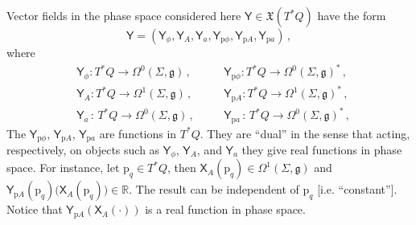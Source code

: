 \documentclass[12pt]{amsart}
\theoremstyle{plain}
\theoremstyle{definition}
\theoremstyle{remark}
\numberwithin{equation}{section}  %
\begin{document}
Vector fields in the phase space considered here $\mathsf{Y}\in\mathfrak{X}(T^*\!Q)$ have the form
\begin{equation}\label{vector_field}
\mathsf{Y}=(\mathsf{Y}_\phi,\mathsf{Y}_A,\mathsf{Y}_{a},\mathsf{Y}_{\mathrm{p} \phi},\mathsf{Y}_{\mathrm{p} A},\mathsf{Y}_{\mathrm{p} a})\,,
\end{equation}
where
\begin{align*}
&\mathsf{Y}_\phi:T^*\!Q\rightarrow\Omega^0(\Sigma,\mathfrak{g})\,,\quad &&\mathsf{Y}_{\mathrm{p} \phi}:T^*\!Q\rightarrow \Omega^0(\Sigma,\mathfrak{g})^*\,,\\
&\mathsf{Y}_A:T^*\!Q\rightarrow\Omega^1(\Sigma,\mathfrak{g})\,,\quad &&\mathsf{Y}_{\mathrm{p} A}:T^*\!Q\rightarrow \Omega^1(\Sigma,\mathfrak{g})^*\,,\\
&\mathsf{Y}_a\,:\,T^*\!Q\rightarrow\Omega^0(\Sigma,\mathfrak{g})\,,\quad &&\mathsf{Y}_{\mathrm{p} a}\,:\,T^*\!Q\rightarrow \Omega^0(\Sigma,\mathfrak{g})^*\,,
\end{align*}
The $\mathsf{Y}_{\mathrm{p} \phi}$, $\mathsf{Y}_{\mathrm{p} A}$, $\mathsf{Y}_{\mathrm{p} a}$ are functions in $T^*\!Q$. They are ``dual'' in the sense that acting, respectively, on objects such as $\mathsf{Y}_\phi$, $\mathsf{Y}_A$, and $ \mathsf{Y}_{a}$ they give real functions in phase space. For instance, let $\mathrm{p}_q\in T^*\!Q$, then $\mathsf{X}_A(\mathrm{p}_q)\in\Omega^1(\Sigma,\mathfrak{g})$ and $\mathsf{Y}_{\mathrm{p} A}(\mathrm{p}_q)\big(\mathsf{X}_A(\mathrm{p}_q)\big)\in\mathbb{R}$. The result can be independent of $\mathrm{p}_q$ [i.e. ``constant'']. Notice that $\mathsf{Y}_{\mathrm{p} A}(\mathsf{X}_A(\cdot{}))$ is a real function in phase space.
\end{document}
